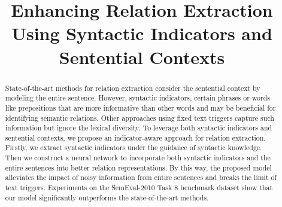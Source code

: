 \documentclass[conference]{IEEEtran}
\begin{document}
\title{Enhancing Relation Extraction Using Syntactic Indicators and Sentential Contexts\\
}

\author{
\and
{}
\and
{}
}

\maketitle

\begin{abstract}
State-of-the-art methods for relation extraction consider the sentential context by modeling the entire sentence. However, syntactic indicators, certain phrases or words like prepositions that are more informative than other words and may be beneficial for identifying semantic relations. Other approaches using fixed text triggers capture such information but ignore the lexical diversity. To leverage both syntactic indicators and sentential contexts, we propose an indicator-aware approach for relation extraction. Firstly, we extract syntactic indicators under the guidance of syntactic knowledge. Then we construct a neural network to incorporate both syntactic indicators and the entire sentences into better relation representations. By this way, the proposed model alleviates the impact of noisy information from entire sentences and breaks the limit of text triggers. Experiments on the SemEval-2010 Task 8 benchmark dataset show that our model significantly outperforms the state-of-the-art methods.
\end{abstract}
\end{document}
